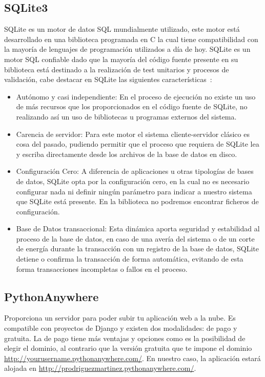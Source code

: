 \documentclass[a4paper, 12pt]{book}
\begin{document}
\subsection{SQLite3}
SQLite es un motor de datos SQL mundialmente utilizado, este motor está desarrollado en una biblioteca programada en C la cual tiene compatibilidad con la mayoría de lenguajes de programación utilizados a día de hoy. SQLite es un motor SQL confiable dado que la mayoría del código fuente presente en su biblioteca está destinado a la realización de test unitarios y procesos de validación, cabe destacar en SQLite las siguientes características~\cite{sqlite}: 
\begin{itemize}
    \item Autónomo y casi independiente: En el proceso de ejecución no existe un uso de más recursos que los proporcionados en el código fuente de SQLite, no realizando así un uso de bibliotecas u programas externos del sistema.
\item Carencia de servidor: Para este motor el sistema cliente-servidor clásico es cosa del pasado, pudiendo permitir que el proceso que requiera de SQLite lea y escriba directamente desde los archivos de la base de datos en disco. 
\item Configuración Cero: A diferencia de aplicaciones u otras tipologías de bases de datos, SQLite opta por la configuración cero, en la cual no es necesario configurar nada ni definir ningún parámetro para indicar a nuestro sistema que SQLite está presente. En la biblioteca no podremos encontrar ficheros de configuración.
\item Base de Datos transaccional: Esta dinámica aporta seguridad y estabilidad al proceso de la base de datos, en caso de una avería del sistema o de un corte de energía durante la transacción con un registro de la base de datos, SQLite detiene o confirma la transacción de forma automática, evitando de esta forma transacciones incompletas o fallos en el proceso.

\end{itemize}
\subsection{PythonAnywhere}
Proporciona un servidor para poder subir tu aplicación web a la nube. Es compatible con proyectos de Django y existen dos modalidades: de pago y gratuita. La de pago tiene más ventajas y opciones como es la posibilidad de elegir el dominio, al contrario que la versión gratuita que te impone el dominio \url{http://yourusername.pythonanywhere.com/}. En nuestro caso, la aplicación estará alojada en \url{http://prodriguezmartinez.pythonanywhere.com/}.
\end{document}
